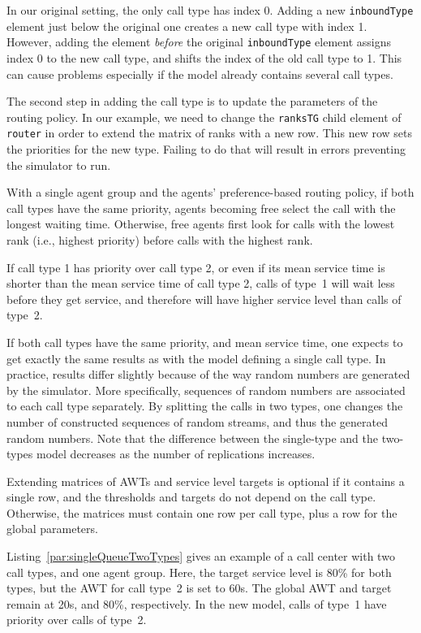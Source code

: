 In our original setting, the only call type has index 0.
Adding a new \texttt{inbound\-Type} element just below the original
one
creates a new call type with index 1.
However, adding the element \emph{before} the original
\texttt{inbound\-Type} element assigns index 0 to the new call type,
and shifts the index of the old call type to 1.
This can cause problems especially if the model already contains
several call types.

The second step in adding the call type is to update the parameters of
the routing policy.  In our example, we need to change
the
\texttt{ranksTG} child element of \texttt{router} in order to extend
the matrix of ranks with a new row.
This new row sets the priorities for the new
type.
Failing to do that will result in errors preventing the simulator to
run.

With a single agent group and
the agents' preference-based routing policy, if both call types have
the same priority,
agents becoming free select the call with the longest waiting time.
Otherwise, free agents first look for calls with the lowest rank
(i.e., highest priority) before calls with the highest rank.

If call type 1 has priority over call type 2, or even if
its mean service time is shorter than the mean service time of
call type 2,
calls of type~1 will wait less before they get service, and
therefore will have higher service level than
calls of type~2.

If both call types have the same priority, and mean service time, one
expects to get exactly the same results as with the model defining a
single call type.
In practice, results differ slightly because of the way random numbers
are generated by the simulator.
More specifically, sequences of random numbers are associated to each
call type separately.  By splitting the calls in two types,
one changes the number of constructed sequences of random streams, and
thus the generated random numbers.
Note that the difference between the single-type and the two-types model
decreases as the number of replications increases.

Extending matrices of AWTs and service level targets is optional if
it contains a single row, and the thresholds and targets do not depend
on the call type.
Otherwise, the matrices must contain one row per call type, plus a row
for the global parameters.

Listing~\ref{par:singleQueueTwoTypes} gives an example of a call
center with two call types, and one agent group.
Here, the target service level is 80\% for both types, but the AWT for
call type~2 is set to 60s.  The global AWT and target remain
at 20s, and 80\%, respectively.
In the new model, calls of type~1 have priority over calls of type~2.

